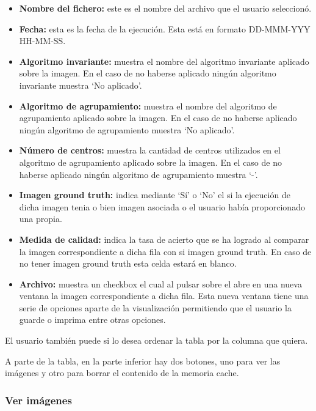\begin{itemize}
    \item \textbf{Nombre del fichero:} este es el nombre del archivo que el usuario seleccionó.
    \item \textbf{Fecha:} esta es la fecha de la ejecución. Esta está en formato DD-MMM-YYY HH-MM-SS.
    \item \textbf{Algoritmo invariante:} muestra el nombre del algoritmo invariante aplicado sobre la imagen. En el caso de no haberse aplicado ningún algoritmo invariante muestra `No aplicado'.
    \item \textbf{Algoritmo de agrupamiento:} muestra el nombre del algoritmo de agrupamiento aplicado sobre la imagen. En el caso de no haberse aplicado ningún algoritmo de agrupamiento muestra `No aplicado'.
    \item \textbf{Número de centros:} muestra la cantidad de centros utilizados en el algoritmo de agrupamiento aplicado sobre la imagen. En el caso de no haberse aplicado ningún algoritmo de agrupamiento muestra `-'.
    \item \textbf{Imagen ground truth:} indica mediante `Sí' o `No' el si la ejecución de dicha imagen tenia o bien imagen asociada o el usuario había proporcionado una propia.
    \item \textbf{Medida de calidad:} indica la tasa de acierto que se ha logrado al comparar la imagen correspondiente a dicha fila con si imagen ground truth. En caso de no tener imagen ground truth esta celda estará en blanco.
    \item \textbf{Archivo:} muestra un checkbox el cual al pulsar sobre el abre en una nueva ventana la imagen correspondiente a dicha fila. Esta nueva ventana tiene una serie de opciones aparte de la visualización permitiendo que el usuario la guarde o imprima entre otras opciones.
\end{itemize}

El usuario también puede si lo desea ordenar la tabla por la columna que quiera.


A parte de la tabla, en la parte inferior hay dos botones, uno para ver las imágenes y otro para borrar el contenido de la memoria cache. 

\subsubsection{Ver imágenes}\label{ver-imágenes}


